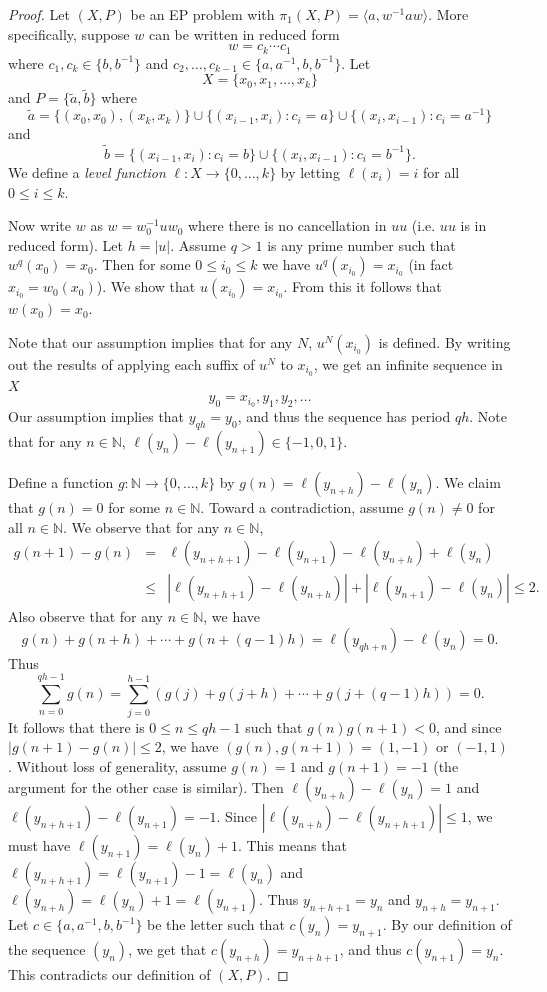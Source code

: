 \documentclass[11pt]{amsart}
\theoremstyle{definition}
\theoremstyle{definition}
\numberwithin{equation}{section}
\begin{document}
\begin{proof} Let $(X, P)$ be an EP problem with $\pi_1(X, P)=\langle a, w^{-1}aw\rangle$. More specifically, suppose $w$ can be written in reduced form 
$$ w=c_k\cdots c_1 $$
where $c_1, c_k\in \{b, b^{-1}\}$ and $c_2, \dots, c_{k-1}\in \{a, a^{-1}, b, b^{-1}\}$. Let 
$$X=\{x_0, x_1, \dots, x_k\}$$ and $P=\{\tilde{a}, \tilde{b}\}$ where
$$ \tilde{a}=\{(x_0, x_0), (x_k, x_k)\}\cup \big\{(x_{i-1}, x_{i})\colon c_i=a\big\}\cup\big\{(x_i, x_{i-1})\colon c_i=a^{-1}\big\} $$
and
$$ \tilde{b}=\big\{(x_{i-1}, x_i)\colon c_i=b\big\}\cup\{(x_i, x_{i-1})\colon c_i=b^{-1}\big\}. $$
We define a {\em level function} $\ell\colon X\to \{0, \dots, k\}$ by letting $\ell(x_i)=i$ for all $0\leq i\leq k$.

Now write $w$ as $w=w_0^{-1}uw_0$ where there is no cancellation in $uu$ (i.e. $uu$ is in reduced form). Let $h=|u|$. Assume $q>1$ is any prime number such that $w^q(x_0)=x_0$. Then for some $0\leq i_0\leq k$ we have $u^q(x_{i_0})=x_{i_0}$ (in fact $x_{i_0}=w_0(x_0)$). We show that $u(x_{i_0})=x_{i_0}$. From this it follows that $w(x_0)=x_0$. 

Note that our assumption implies that for any $N$, $u^N(x_{i_0})$ is defined. By writing out the results of applying each suffix of $u^N$ to $x_{i_0}$, we get an infinite sequence in $X$
$$ y_0=x_{i_0}, y_1, y_2, \dots $$
Our assumption implies that $y_{qh}=y_0$, and thus the sequence has period $qh$. Note that for any $n\in\mathbb{N}$, $\ell(y_n)-\ell(y_{n+1})\in\{-1,0,1\}$. 

Define a function $g\colon \mathbb{N}\to\{0,\dots, k\}$ by $g(n)=\ell(y_{n+h})-\ell(y_n)$. We claim that $g(n)=0$ for some $n\in\mathbb{N}$. Toward a contradiction, assume $g(n)\neq 0$ for all $n\in\mathbb{N}$. We observe that for any $n\in\mathbb{N}$, 
$$ \begin{array}{rcl} g(n+1)-g(n)&=&\ell(y_{n+h+1})-\ell(y_{n+1})-\ell(y_{n+h})+\ell(y_n) \\
& \leq &|\ell(y_{n+h+1})-\ell(y_{n+h})|+|\ell(y_{n+1})-\ell(y_n)| \leq 2.
\end{array}$$
Also observe that for any $n\in\mathbb{N}$, we have
$$ g(n)+g(n+h)+\cdots+g(n+(q-1)h)=\ell(y_{qh+n})-\ell(y_n)=0. $$
Thus 
$$ \displaystyle\sum_{n=0}^{qh-1}g(n)=\displaystyle\sum_{j=0}^{h-1}(g(j)+g(j+h)+\cdots+g(j+(q-1)h))=0. $$
It follows that there is $0\leq n\leq qh-1$ such that $g(n)g(n+1)<0$, and since $|g(n+1)-g(n)|\leq 2$, we have $(g(n), g(n+1))=(1,-1)$ or $(-1,1)$. Without loss of generality, assume $g(n)=1$ and $g(n+1)=-1$ (the argument for the other case is similar). 
Then $\ell(y_{n+h})-\ell(y_n)=1$ and $\ell(y_{n+h+1})-\ell(y_{n+1})=-1$. Since $|\ell(y_{n+h})-\ell(y_{n+h+1})|\leq 1$, we must have $\ell(y_{n+1})=\ell(y_n)+1$. This means that $\ell(y_{n+h+1})=\ell(y_{n+1})-1=\ell(y_n)$ and $\ell(y_{n+h})=\ell(y_n)+1=\ell(y_{n+1})$. Thus $y_{n+h+1}=y_n$ and $y_{n+h}=y_{n+1}$. Let $c\in\{a, a^{-1}, b, b^{-1}\}$ be the letter such that $c(y_n)=y_{n+1}$. By our definition of the sequence $(y_n)$, we get that $c(y_{n+h})=y_{n+h+1}$, and thus $c(y_{n+1})=y_n$. This contradicts our definition of $(X, P)$. 



\end{proof}
\end{document}
